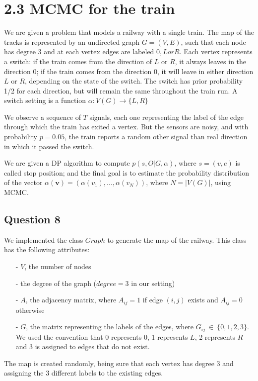 \documentclass[]{article}
\begin{document}
\newpage

\section*{2.3 MCMC for the train}
We are given a problem that models a railway with a single train. The map of the tracks is represented by an undirected graph $G=(V,E)$, such that each node has degree 3 and at each vertex edges are labeled $0, L or R$. Each vertex represents a switch: if the train comes from the direction of $L$ or $R$, it always leaves in the direction 0; if the train comes from the direction $0$, it will leave in either direction $L$ or $R$, depending on the state of the switch. The switch has prior probability 1/2 for each direction, but will remain the same throughout the train run. A switch setting is a function $\alpha : V(G) \rightarrow \{L,R\}$

We observe a sequence of $T$ signals, each one representing the label of the edge through which the train has exited a vertex. But the sensors are noisy, and with probability $p = 0.05$, the train reports a random other signal than real direction in which it passed the switch. 

We are given a DP algorithm to compute $p(s,O|G,\alpha)$, where $s=(v,e)$ is called stop position; and the final goal is to estimate the probability distribution of the vector $\alpha(\mathbf{v}) = (\alpha(v_1), ..., \alpha(v_N))$,  where $ N=|V(G)| $, using MCMC.

\subsection*{Question 8}
We implemented the class $Graph$ to generate the map of the railway. This class has the following attributes:
\begin{enumerate}
	\item[-] $V$, the number of nodes 
	\item[-] the degree of the graph ($degree=3$ in our setting) 
	\item[-] $A$, the adjacency matrix, where $A_{ij}=1$ if edge $(i,j)$ exists and $A_{ij}=0$ otherwise
	\item[-] $G$, the matrix representing the labels of the edges, where $G_{ij} \ \in \ \{ 0,1,2,3\} $. We used the convention that 0 represents 0, 1 represents $L$, 2 represents $R$ and 3 is assigned to edges that do not exist.
\end{enumerate} 
The map is created randomly, being sure that each vertex has degree 3 and assigning the 3 different labels to the existing edges.
\end{document}
